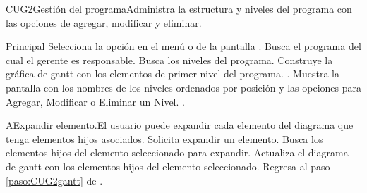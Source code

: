 
	\begin{UseCase}{CUG2}{Gestión del programa}{Administra la estructura y niveles del programa con las opciones de agregar, modificar y eliminar.}
	\end{UseCase}

	\begin{UCtrayectoria}{Principal}
		\UCpaso[\UCactor] Selecciona la opción  en el menú  o  de la pantalla .
		\UCpaso Busca el programa del cual el gerente es responsable.
		\UCpaso Busca los niveles del programa.
		\UCpaso Construye la gráfica de gantt con los elementos de primer nivel del programa.    \label{paso:CUG2gantt}.
		\UCpaso Muestra la pantalla  con los nombres de los niveles ordenados por posición y las opciones para Agregar, Modificar o Eliminar un Nivel.   \label{paso:CUG2niveles}.
	\end{UCtrayectoria}

	\begin{UCtrayectoriaA}{A}{Expandir elemento.}{El usuario puede expandir cada elemento del diagrama que tenga elementos hijos asociados.}
			\UCpaso[\UCactor] Solicita expandir un elemento.
			\UCpaso Busca los elementos hijos del elemento seleccionado para expandir.
			\UCpaso Actualiza el diagrama de gantt con los elementos hijos del elemento seleccionado.
			\UCpaso Regresa al paso \ref{paso:CUG2gantt} de .
	\end{UCtrayectoriaA}

